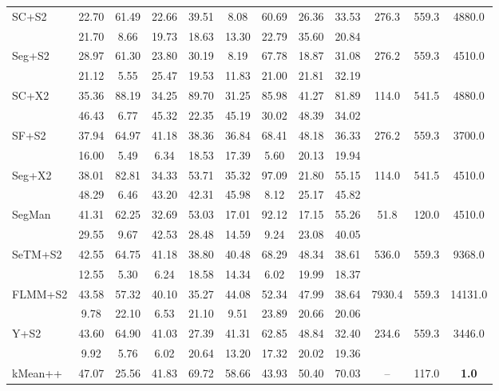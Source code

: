 \documentclass[preprint,12pt]{elsarticle}
\begin{document}
\begin{table}[!htbp]
\begin{tabular}{lccccccccccc}
SC+S2 & 22.70 & 61.49 & 22.66 & 39.51 & 8.08 & 60.69 & 26.36 & 33.53 & 276.3 & 559.3 & 4880.0 \\
  & 21.70 & 8.66 & 19.73 & 18.63 & 13.30 & 22.79 & 35.60 & 20.84 &  &  &  \\ \addlinespace[2pt]
\rowcolor{gray!12}
Seg+S2 & 28.97 & 61.30 & 23.80 & 30.19 & 8.19 & 67.78 & 18.87 & 31.08 & 276.2 & 559.3 & 4510.0 \\
  & 21.12 & 5.55 & 25.47 & 19.53 & 11.83 & 21.00 & 21.81 & 32.19 &  &  &  \\ \addlinespace[2pt]
SC+X2 & 35.36 & 88.19 & 34.25 & 89.70 & 31.25 & 85.98 & 41.27 & 81.89 & 114.0 & 541.5 & 4880.0 \\
  & 46.43 & 6.77 & 45.32 & 22.35 & 45.19 & 30.02 & 48.39 & 34.02 &  &  &  \\ \addlinespace[2pt]
\rowcolor{gray!12}
SF+S2 & 37.94 & 64.97 & 41.18 & 38.36 & 36.84 & 68.41 & 48.18 & 36.33 & 276.2 & 559.3 & 3700.0 \\
  & 16.00 & 5.49 & 6.34 & 18.53 & 17.39 & 5.60 & 20.13 & 19.94 &  &  &  \\ \addlinespace[2pt]
Seg+X2 & 38.01 & 82.81 & 34.33 & 53.71 & 35.32 & 97.09 & 21.80 & 55.15 & 114.0 & 541.5 & 4510.0 \\
  & 48.29 & 6.46 & 43.20 & 42.31 & 45.98 & 8.12 & 25.17 & 45.82 &  &  &  \\ \addlinespace[2pt]
\rowcolor{gray!12}
SegMan & 41.31 & 62.25 & 32.69 & 53.03 & 17.01 & 92.12 & 17.15 & 55.26 & 51.8 & 120.0 & 4510.0 \\
  & 29.55 & 9.67 & 42.53 & 28.48 & 14.59 & 9.24 & 23.08 & 40.05 &  &  &  \\ \addlinespace[2pt]
SeTM+S2 & 42.55 & 64.75 & 41.18 & 38.80 & 40.48 & 68.29 & 48.34 & 38.61 & 536.0 & 559.3 & 9368.0 \\
  & 12.55 & 5.30 & 6.24 & 18.58 & 14.34 & 6.02 & 19.99 & 18.37 &  &  &  \\ \addlinespace[2pt]
\rowcolor{gray!12}
FLMM+S2 & 43.58 & 57.32 & 40.10 & 35.27 & 44.08 & 52.34 & 47.99 & 38.64 & 7930.4 & 559.3 & 14131.0 \\
  & 9.78 & 22.10 & 6.53 & 21.10 & 9.51 & 23.89 & 20.66 & 20.06 &  &  &  \\ \addlinespace[2pt]
Y+S2 & 43.60 & 64.90 & 41.03 & 27.39 & 41.31 & 62.85 & 48.84 & 32.40 & 234.6 & 559.3 & 3446.0 \\
  & 9.92 & 5.76 & 6.02 & 20.64 & 13.20 & 17.32 & 20.02 & 19.36 &  &  &  \\ \addlinespace[2pt]
\rowcolor{gray!12}
kMean++ & 47.07 & 25.56 & 41.83 & 69.72 & 58.66 & 43.93 & 50.40 & 70.03 & -- & 117.0 & \textbf{1.0} \\

\end{tabular}
\end{table}
\end{document}
